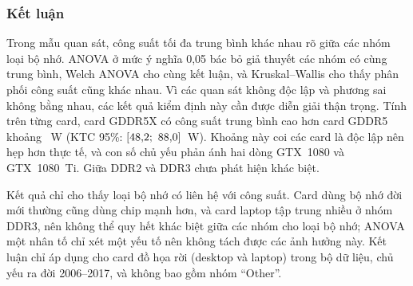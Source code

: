 \subsubsection{Kết luận}

Trong mẫu quan sát, công suất tối đa trung bình khác nhau rõ giữa các nhóm loại bộ nhớ. ANOVA
ở mức ý nghĩa 0,05 bác bỏ giả thuyết các nhóm có cùng trung bình, Welch ANOVA cho cùng kết
luận, và Kruskal--Wallis cho thấy phân phối công suất cũng khác nhau. Vì các quan sát không độc
lập và phương sai không bằng nhau, các kết quả kiểm định này cần được diễn giải thận trọng.
Tính trên từng card, card GDDR5X có công suất trung bình cao hơn card GDDR5 khoảng
\AnovaGddrFiveXMinusGddrFive~W (KTC 95\%:
$[\AnovaGddrFiveXMinusGddrFiveLow;\allowbreak\ \AnovaGddrFiveXMinusGddrFiveHigh]$~W). Khoảng này
coi các card là độc lập nên hẹp hơn thực tế, và con số chủ yếu phản ánh hai dòng GTX~1080 và
GTX~1080~Ti. Giữa DDR2 và DDR3 chưa phát hiện khác biệt.

Kết quả chỉ cho thấy loại bộ nhớ có liên hệ với công suất. Card dùng bộ nhớ đời mới thường
cũng dùng chip mạnh hơn, và card laptop tập trung nhiều ở nhóm DDR3, nên không thể quy hết khác
biệt giữa các nhóm cho loại bộ nhớ; ANOVA một nhân tố chỉ xét một yếu tố nên không tách được
các ảnh hưởng này. Kết luận chỉ áp dụng cho card đồ họa rời (desktop và laptop) trong bộ dữ liệu, chủ yếu
ra đời 2006--2017, và không bao gồm nhóm ``Other''.
